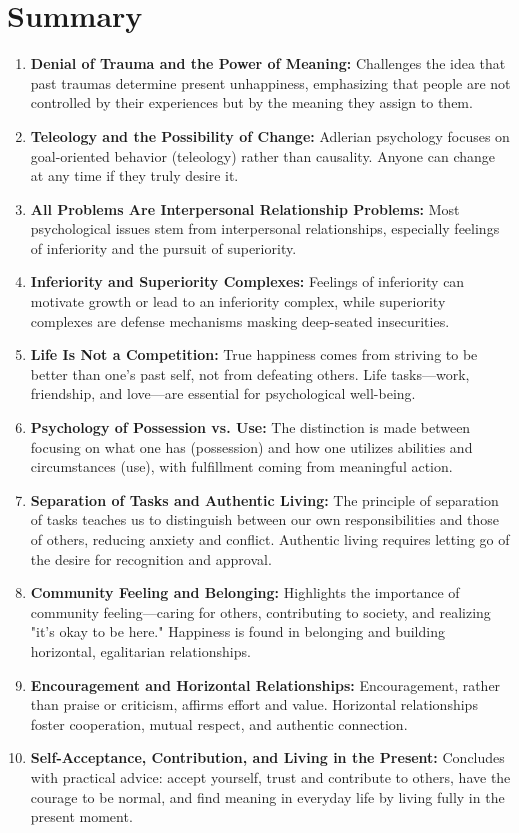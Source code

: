 \section*{Summary}
\begin{enumerate}

    \item \textbf{Denial of Trauma and the Power of Meaning:} Challenges the idea that past traumas determine present unhappiness, emphasizing that people are not controlled by their experiences but by the meaning they assign to them.
    \item \textbf{Teleology and the Possibility of Change:} Adlerian psychology focuses on goal-oriented behavior (teleology) rather than causality. Anyone can change at any time if they truly desire it.
    \item \textbf{All Problems Are Interpersonal Relationship Problems:} Most psychological issues stem from interpersonal relationships, especially feelings of inferiority and the pursuit of superiority.
    \item \textbf{Inferiority and Superiority Complexes:} Feelings of inferiority can motivate growth or lead to an inferiority complex, while superiority complexes are defense mechanisms masking deep-seated insecurities.
    \item \textbf{Life Is Not a Competition:} True happiness comes from striving to be better than one’s past self, not from defeating others. Life tasks—work, friendship, and love—are essential for psychological well-being.
    \item \textbf{Psychology of Possession vs. Use:} The distinction is made between focusing on what one has (possession) and how one utilizes abilities and circumstances (use), with fulfillment coming from meaningful action.
    \item \textbf{Separation of Tasks and Authentic Living:} The principle of separation of tasks teaches us to distinguish between our own responsibilities and those of others, reducing anxiety and conflict. Authentic living requires letting go of the desire for recognition and approval.
    \item \textbf{Community Feeling and Belonging:} Highlights the importance of community feeling—caring for others, contributing to society, and realizing "it's okay to be here." Happiness is found in belonging and building horizontal, egalitarian relationships.
    \item \textbf{Encouragement and Horizontal Relationships:} Encouragement, rather than praise or criticism, affirms effort and value. Horizontal relationships foster cooperation, mutual respect, and authentic connection.
    \item \textbf{Self-Acceptance, Contribution, and Living in the Present:} Concludes with practical advice: accept yourself, trust and contribute to others, have the courage to be normal, and find meaning in everyday life by living fully in the present moment.
\end{enumerate}
